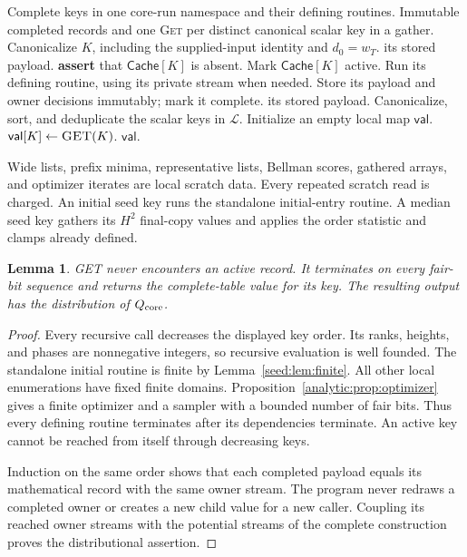 \documentclass[11pt]{article}
\newenvironment{wedalgorithm}[2]{%
  \begin{algorithm}[!htbp]%
  \caption{#1}\label{#2}%
  \small\begin{algorithmic}[1]%
}{%
  \end{algorithmic}\end{algorithm}%
}
\newtheorem{lemma}[theorem]{Lemma}
\theoremstyle{definition}
\newcommand{\1}{\mathbf 1}
\begin{document}
\begin{wedalgorithm}{Coherent lazy evaluation and batched scalar reads}{alg:get-gather}
\Require Complete keys in one core-run namespace and their defining routines.
\Ensure Immutable completed records and one \textsc{Get} per distinct canonical scalar key in a gather.
  \State Canonicalize $K$, including the supplied-input identity and $d_0=w_T$.
    \State \Return its stored payload.
  \EndIf
  \State \textbf{assert} that $\mathsf{Cache}[K]$ is absent.
  \State Mark $\mathsf{Cache}[K]$ active.
  \State Run its defining routine, using its private stream when needed.
  \State Store its payload and owner decisions immutably; mark it complete.
  \State \Return its stored payload.
\EndProcedure
\Statex
{}
  \State Canonicalize, sort, and deduplicate the scalar keys in $\mathcal L$.
  \State Initialize an empty local map $\mathsf{val}$.
    \State $\mathsf{val}[K]\gets\Call{GET}{K}$.
  \EndFor
  \State \Return $\mathsf{val}$.
\EndProcedure
\end{wedalgorithm}
\FloatBarrier


Wide lists, prefix minima, representative lists, Bellman scores,
gathered arrays, and optimizer iterates are local scratch data.
Every repeated scratch read is charged.
An initial seed key runs the standalone initial-entry routine.
A median seed key gathers its $H^2$ final-copy values and applies the
order statistic and clamps already defined.

\begin{lemma}\label{core:lem:cache}
GET never encounters an active record. It terminates on every
fair-bit sequence and returns the complete-table value for its key.
The resulting output has the distribution of $Q_{\rm core}$.
\end{lemma}
\begin{proof}
Every recursive call decreases the displayed key order.
Its ranks, heights, and phases are nonnegative integers, so recursive
evaluation is well founded. The standalone initial routine is finite
by Lemma~\ref{seed:lem:finite}.
All other local enumerations have fixed finite domains.
Proposition~\ref{analytic:prop:optimizer} gives a finite optimizer and a
sampler with a bounded number of fair bits.
Thus every defining routine terminates after its dependencies terminate.
An active key cannot be reached from itself through decreasing keys.

Induction on the same order shows that each completed payload equals
its mathematical record with the same owner stream.
The program never redraws a completed owner or creates a new child
value for a new caller. Coupling its reached owner streams with the
potential streams of the complete construction proves the
distributional assertion.
\end{proof}
\end{document}
